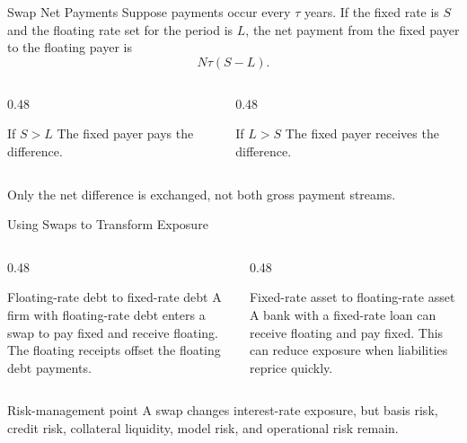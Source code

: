 \documentclass[aspectratio=169,11pt]{beamer}
\newcommand{\notional}{N}
\begin{document}
\begin{frame}{Swap Net Payments}
    Suppose payments occur every \(\tau\) years.
    If the fixed rate is \(S\) and the floating rate set for the period is \(L\), the net payment from the fixed payer to the floating payer is
    \[
        \notional\tau(S-L).
    \]

    \begin{columns}[T]
        \begin{column}{0.48\textwidth}
            \begin{block}{If \(S>L\)}
                The fixed payer pays the difference.
            \end{block}
        \end{column}
        \begin{column}{0.48\textwidth}
            \begin{block}{If \(L>S\)}
                The fixed payer receives the difference.
            \end{block}
        \end{column}
    \end{columns}

    \vspace{0.5em}
    Only the net difference is exchanged, not both gross payment streams.
\end{frame}

\begin{frame}{Using Swaps to Transform Exposure}
    \begin{columns}[T]
        \begin{column}{0.48\textwidth}
            \begin{block}{Floating-rate debt to fixed-rate debt}
                A firm with floating-rate debt enters a swap to pay fixed and receive floating.
                The floating receipts offset the floating debt payments.
            \end{block}
        \end{column}
        \begin{column}{0.48\textwidth}
            \begin{block}{Fixed-rate asset to floating-rate asset}
                A bank with a fixed-rate loan can receive floating and pay fixed.
                This can reduce exposure when liabilities reprice quickly.
            \end{block}
        \end{column}
    \end{columns}

    \begin{alertblock}{Risk-management point}
        A swap changes interest-rate exposure, but basis risk, credit risk, collateral liquidity, model risk, and operational risk remain.
    \end{alertblock}
\end{frame}
\end{document}
